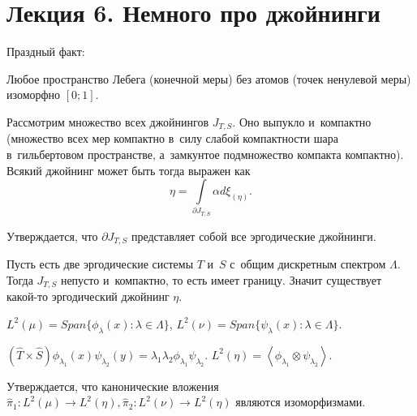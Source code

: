 \documentclass{article}
\begin{document}
\section*{Лекция 6. Немного про джойнинги}
\resetcntrs

Праздный факт:
\begin{theorem}[Рохлин]
	Любое пространство Лебега (конечной меры) без атомов (точек ненулевой меры)
	изоморфно $[0; 1]$.
\end{theorem}

Рассмотрим множество всех джойнингов $J_{T,S}$. Оно выпукло и~компактно
(множество всех мер компактно в~силу слабой компактности шара в~гильбертовом
пространстве, а~замкунтое подмножество компакта компактно). Всякий джойнинг
может быть тогда выражен как
$$ \eta = \int\limits_{\partial J_{T,S}} \alpha d\xi_{(\eta)}. $$

Утверждается, что $\partial J_{T,S}$ представляет собой все эргодические
джойнинги.

Пусть есть две эргодические системы $T$ и~$S$ с~общим дискретным спектром
$\Lambda$. Тогда $J_{T,S}$ непусто и~компактно, то есть имеет границу. Значит
существует какой-то эргодический джойнинг $\eta$.

$L^2(\mu) = Span\{ \phi_\lambda(x): \lambda \in \Lambda \}$,
$L^2(\nu) = Span\{ \psi_\lambda(x): \lambda \in \Lambda \}$.

$(\hat T \times \hat S) \phi_{\lambda_1}(x) \psi_{\lambda_2}(y) = \lambda_1
\lambda_2 \phi_{\lambda_1} \psi_{\lambda_2}$. $L^2(\eta) = \left<
\phi_{\lambda_1} \otimes \psi_{\lambda_2} \right>$.

Утверждается, что канонические вложения $\hat \pi_1: L^2(\mu) \rightarrow
L^2(\eta), \hat \pi_2: L^2(\nu) \rightarrow L^2(\eta)$ являются изоморфизмами.
\end{document}

